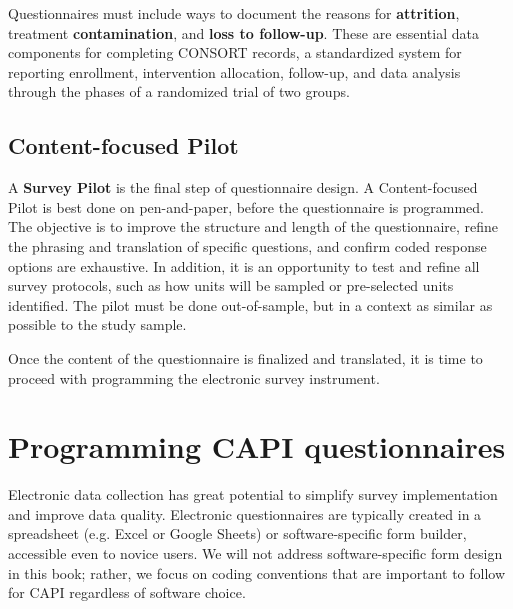 Questionnaires must include ways to document the reasons for \textbf{attrition}, treatment \textbf{contamination}, and \textbf{loss to follow-up}.
These are essential data components for completing CONSORT records, a standardized system for reporting enrollment, intervention allocation, follow-up, and data analysis through the phases of a randomized trial of two groups.



\subsection{Content-focused Pilot}
A \textbf{Survey Pilot}  is the final step of questionnaire design.
A Content-focused Pilot   is best done on pen-and-paper, before the questionnaire is programmed.
The objective is to improve the structure and length of the questionnaire, refine the phrasing and translation of specific questions, and confirm coded response options are exhaustive.
In addition, it is an opportunity to test and refine all survey protocols, such as how units will be sampled or pre-selected units identified. The pilot must be done out-of-sample, but in a context as similar as possible to the study sample.

Once the content of the questionnaire is finalized and translated, it is time to proceed with programming the electronic survey instrument.


\section{Programming CAPI questionnaires}
Electronic data collection has great potential to simplify survey implementation and improve data quality.
Electronic questionnaires are typically created in a spreadsheet (e.g. Excel or Google Sheets) or software-specific form builder, accessible even to novice users. 
We will not address software-specific form design in this book; rather, we focus on coding conventions that are important to follow for CAPI regardless of software choice.

